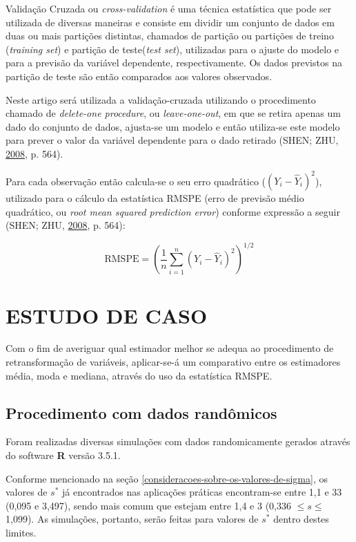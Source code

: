 \documentclass[a4paper, 12pt]{article}
\begin{document}
Validação Cruzada ou \emph{cross-validation} é uma técnica estatística
que pode ser utilizada de diversas maneiras e consiste em dividir um
conjunto de dados em duas ou mais partições distintas, chamados de
partição ou partições de treino (\emph{training set}) e partição de
teste(\emph{test set}), utilizadas para o ajuste do modelo e para a
previsão da variável dependente, respectivamente. Os dados previstos na
partição de teste são então comparados aos valores observados.

Neste artigo será utilizada a validação-cruzada utilizando o
procedimento chamado de \emph{delete-one procedure}, ou
\emph{leave-one-out}, em que se retira apenas um dado do conjunto de
dados, ajusta-se um modelo e então utiliza-se este modelo para prever o
valor da variável dependente para o dado retirado (SHEN; ZHU,
\protect\hyperlink{ref-shen}{2008}, p. 564).

Para cada observação então calcula-se o seu erro quadrático
(\((Y_i - \hat{Y}_i)^2\)), utilizado para o cálculo da estatística RMSPE
(erro de previsão médio quadrático, ou \emph{root mean squared
prediction error}) conforme expressão a seguir (SHEN; ZHU,
\protect\hyperlink{ref-shen}{2008}, p. 564):

\[\text{RMSPE} = \left ( \frac{1}{n}\sum_{i = 1}^{n}(Y_i - \hat{Y}_i)^2 \right ) ^{1/2}\]

\section{ESTUDO DE CASO}\label{estudo-de-caso}

Com o fim de averiguar qual estimador melhor se adequa ao procedimento
de retransformação de variáveis, aplicar-se-á um comparativo entre os
estimadores média, moda e mediana, através do uso da estatística RMSPE.

\subsection{Procedimento com dados
randômicos}\label{procedimento-com-dados-randomicos}

Foram realizadas diversas simulações com dados randomicamente gerados
através do software \textbf{R} versão 3.5.1.

Conforme mencionado na seção
\ref{consideracoes-sobre-os-valores-de-sigma}, os valores de \(s^*\) já
encontrados nas aplicações práticas encontram-se entre 1,1 e 33 (0,095 e
3,497), sendo mais comum que estejam entre 1,4 e 3 (0,336
\(\leq s \leq\) 1,099). As simulações, portanto, serão feitas para
valores de \(s^*\) dentro destes limites.
\end{document}
